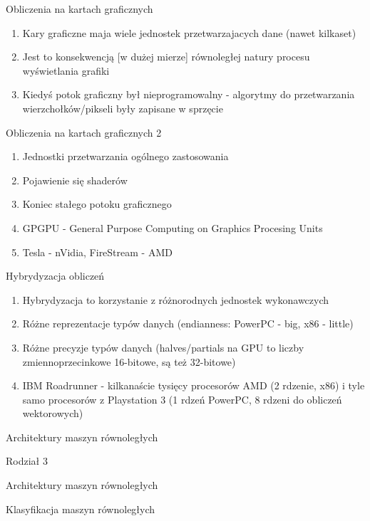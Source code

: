 \documentclass{beamer}
\begin{document}
\begin{frame}{Obliczenia na kartach graficznych}
  \begin{enumerate}
  \item Kary graficzne maja wiele jednostek przetwarzajacych dane (nawet kilkaset)
  \item Jest to konsekwencją [w dużej mierze] równoległej natury procesu wyświetlania grafiki
  \item Kiedyś potok graficzny był nieprogramowalny - algorytmy do przetwarzania wierzchołków/pikseli były zapisane w sprzęcie
  \end{enumerate}
\end{frame}

\begin{frame}{Obliczenia na kartach graficznych 2}
  \begin{enumerate}
  \item Jednostki przetwarzania ogólnego zastosowania
  \item Pojawienie się shaderów
  \item Koniec stałego potoku graficznego
  \item GPGPU - General Purpose Computing on Graphics Procesing Units
  \item Tesla - nVidia, FireStream - AMD
  \end{enumerate}
\end{frame}

\begin{frame}{Hybrydyzacja obliczeń}
  \begin{enumerate}
  \item Hybrydyzacja to korzystanie z różnorodnych jednostek wykonawczych
  \item Różne reprezentacje typów danych (endianness: PowerPC - big, x86 - little)
  \item Różne precyzje typów danych (halves/partials na GPU to liczby zmiennoprzecinkowe 16-bitowe, są też 32-bitowe)
  \item IBM Roadrunner - kilkanaście tysięcy procesorów AMD (2 rdzenie, x86) i tyle samo procesorów z Playstation 3 (1 rdzeń PowerPC, 8 rdzeni do obliczeń wektorowych)
  \end{enumerate}
\end{frame}

\begin{frame}{Architektury maszyn równoległych}
  \huge
  \begin{center}
    Rodział 3

    Architektury maszyn równoległych

    \large

    Klasyfikacja maszyn równoległych
  \end{center}
\end{frame}
\end{document}

